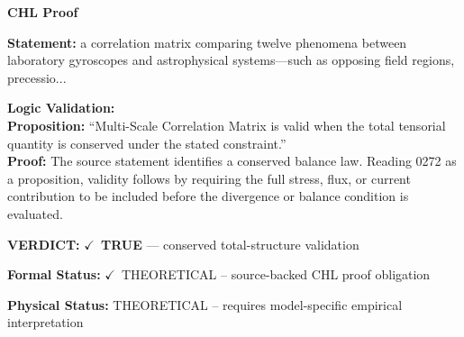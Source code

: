 \vspace{0.45em}
\noindent\textbf{CHL Proof}\par
\textbf{Statement:} a correlation matrix comparing twelve phenomena between laboratory gyroscopes and
astrophysical systems---such as opposing field regions, precessio...

\textbf{Logic Validation:}\\
\textbf{Proposition:} ``Multi-Scale Correlation Matrix is valid when the total tensorial quantity is conserved
under the stated constraint.''\\
\textbf{Proof:} The source statement identifies a conserved balance law. Reading 0272 as a proposition,
validity follows by requiring the full stress, flux, or current contribution to be
included before the divergence or balance condition is evaluated.

\textbf{VERDICT:} \ensuremath{\checkmark}\ \textbf{TRUE} --- conserved total-structure validation

\textbf{Formal Status:} \ensuremath{\checkmark}\ THEORETICAL -- source-backed CHL proof obligation

\textbf{Physical Status:} THEORETICAL -- requires model-specific empirical interpretation
\par\vspace{0.45em}
\par
\ifTZPDarkEdition
{}
\fi
\endgroup
\endgroup
